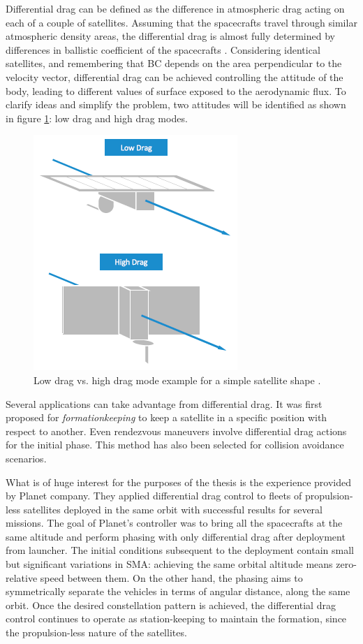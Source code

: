 Differential drag can be defined as the difference in atmospheric drag acting on each of a couple of satellites.
Assuming that the spacecrafts travel through similar atmospheric density areas, the differential drag is almost fully determined by differences in ballistic coefficient of the spacecrafts \cite{leonard1991formationkeeping}.
Considering identical satellites, and remembering that BC depends on the area perpendicular to the velocity vector, differential drag can be achieved controlling the attitude of the body, leading to different values of surface exposed to the aerodynamic flux. 
To clarify ideas and simplify the problem, two attitudes will be identified as shown in figure \ref{low_vs_high_dragmode_fig}: low drag and high drag modes.
\begin{figure}
    \centering
    \includegraphics[scale=1]{img/low_vs_high_dragmode.png}
    \caption{Low drag vs. high drag mode example for a simple satellite shape \cite{foster2018differential}.}
    \label{low_vs_high_dragmode_fig}
\end{figure}

Several applications can take advantage from differential drag. It was first proposed for \textit{formationkeeping} to keep a satellite in a specific position with respect to another.
Even rendezvous maneuvers involve differential drag actions for the initial phase.
This method has also been selected for collision avoidance scenarios.

What is of huge interest for the purposes of the thesis is the experience provided by Planet company.
They applied differential drag control to fleets of propulsion-less satellites deployed in the same orbit with successful results for several missions.
The goal of Planet's controller was to bring all the spacecrafts at the same altitude and perform phasing with only differential drag after deployment from launcher.
The initial conditions subsequent to the deployment contain small but significant variations in SMA: achieving the same orbital altitude means zero-relative speed between them.
On the other hand, the phasing aims to symmetrically separate the vehicles in terms of angular distance, along the same orbit. 
Once the desired constellation pattern is achieved, the differential drag control continues to operate as station-keeping to maintain the formation, since the propulsion-less nature of the satellites.

